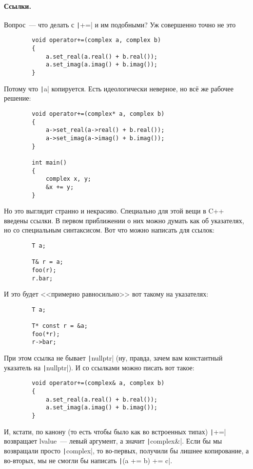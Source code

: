 \documentclass{article}
\begin{document}
    \paragraph{Ссылки.}
    Вопрос~--- что делать с \texttt|+=| и им подобными? Уж совершенно точно не это
    \begin{verbatim}
        void operator+=(complex a, complex b)
        {
            a.set_real(a.real() + b.real());
            a.set_imag(a.imag() + b.imag());
        }
    \end{verbatim}
    Потому что \texttt|a| копируется. Есть идеологически неверное, но всё же рабочее решение:
    \begin{verbatim}
        void operator+=(complex* a, complex b)
        {
            a->set_real(a->real() + b.real());
            a->set_imag(a->imag() + b.imag());
        }
    
        int main()
        {
            complex x, y;
            &x += y;
        }
    \end{verbatim}
    Но это выглядит странно и некрасиво. Специально для этой вещи в C++ введены ссылки. В первом приближении о них можно думать как об указателях, но со специальным синтаксисом. Вот что можно написать для ссылок:
    \begin{verbatim}
        T a;

        T& r = a;
        foo(r);
        r.bar;
    \end{verbatim}
    И это будет <<примерно равносильно>> вот такому на указателях:
    \begin{verbatim}
        T a;

        T* const r = &a;
        foo(*r);
        r->bar;
    \end{verbatim}
    При этом ссылка не бывает \texttt|nullptr| (ну, правда, зачем вам константный указатель на \texttt|nullptr|). И со ссылками можно писать вот такое:
    \begin{verbatim}
        void operator+=(complex& a, complex b)
        {
            a.set_real(a.real() + b.real());
            a.set_imag(a.imag() + b.imag());
        }
    \end{verbatim}
    И, кстати, по канону (то есть чтобы было как во встроенных типах) \texttt|+=| возвращает lvalue~--- левый аргумент, а значит \texttt|complex&|. Если бы мы возвращали просто \texttt|complex|, то во-первых, получили бы лишнее копирование, а во-вторых, мы не смогли бы написать \texttt|(a += b) += c|.
\end{document}
